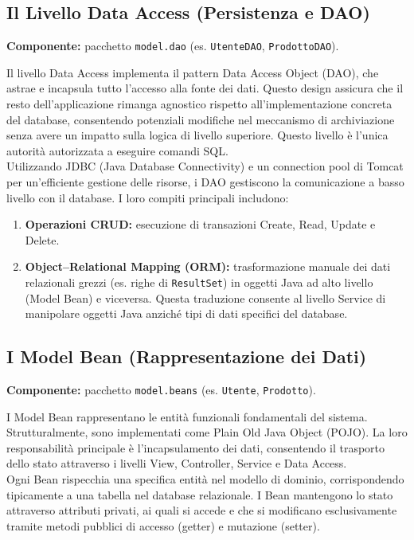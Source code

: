 \subsection{Il Livello Data Access (Persistenza e DAO)}
\noindent\textbf{Componente:} pacchetto \texttt{model.dao} (es. \texttt{UtenteDAO}, \texttt{ProdottoDAO}).

\noindent Il livello Data Access implementa il pattern Data Access Object (DAO), che astrae e incapsula tutto l'accesso alla fonte dei dati. Questo design assicura che il resto dell'applicazione rimanga agnostico rispetto all'implementazione concreta del database, consentendo potenziali modifiche nel meccanismo di archiviazione senza avere un impatto sulla logica di livello superiore. Questo livello è l'unica autorità autorizzata a eseguire comandi SQL.\\

Utilizzando JDBC (Java Database Connectivity) e un connection pool di Tomcat per un'efficiente gestione delle risorse, i DAO gestiscono la comunicazione a basso livello con il database. I loro compiti principali includono:
\begin{enumerate}
	\item \textbf{Operazioni CRUD:} esecuzione di transazioni Create, Read, Update e Delete.
	\item \textbf{Object--Relational Mapping (ORM):} trasformazione manuale dei dati relazionali grezzi (es. righe di \texttt{ResultSet}) in oggetti Java ad alto livello (Model Bean) e viceversa. Questa traduzione consente al livello Service di manipolare oggetti Java anziché tipi di dati specifici del database.
\end{enumerate}

\subsection{I Model Bean (Rappresentazione dei Dati)}
\noindent\textbf{Componente:} pacchetto \texttt{model.beans} (es. \texttt{Utente}, \texttt{Prodotto}).

\noindent I Model Bean rappresentano le entità funzionali fondamentali del sistema. Strutturalmente, sono implementati come Plain Old Java Object (POJO). La loro responsabilità principale è l'incapsulamento dei dati, consentendo il trasporto dello stato attraverso i livelli View, Controller, Service e Data Access.\\

Ogni Bean rispecchia una specifica entità nel modello di dominio, corrispondendo tipicamente a una tabella nel database relazionale. I Bean mantengono lo stato attraverso attributi privati, ai quali si accede e che si modificano esclusivamente tramite metodi pubblici di accesso (getter) e mutazione (setter).

